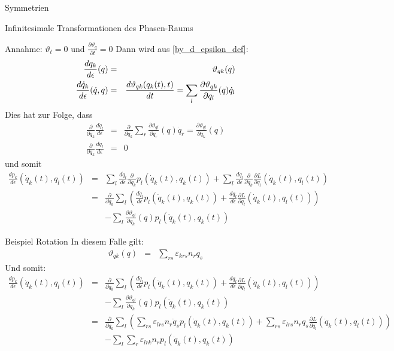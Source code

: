 \documentclass[a4paper,fleqn]{article}
\newcommand{\titlemath}[1]{\texorpdfstring{#1}{}}
\numberwithin{equation}{section}
\begin{document}
\begin{section}{Symmetrien}
\begin{subsection}{Infinitesimale Transformationen des Phasen-Raums}
\begin{subsubsection}{Annahme: \titlemath{$\vartheta_t=0$} und \titlemath{$\frac{\partial\vartheta_q}{\partial t}=0$}}
Dann wird aus \ref{by_d_epsilon_def}:
\begin{eqnarray*}
\frac{dq_k}{d\epsilon}(q) &=& \vartheta_{qk}(q)\cr
\frac{d\dot{q}_k}{d\epsilon}(\dot{q},q) &=&\frac{d\vartheta_{qk}(q_k(t),t)}{dt}
=\sum_l\frac{\partial\vartheta_{qk}}{\partial q_l}(q)\dot{q}_l
\end{eqnarray*}
Dies hat zur Folge, dass
\begin{eqnarray*}
\frac{\partial}{\partial \dot{q}_k}\frac{d\dot{q}_l}{d\epsilon} &=& \frac{\partial}{\partial \dot{q}_k}\sum_r\frac{\partial\vartheta_{ql}}{\partial q_r}(q)\dot{q}_r=\frac{\partial\vartheta_{ql}}{\partial q_k}(q)\\
\frac{\partial}{\partial \dot{q}_k}\frac{dq_l}{d\epsilon} &=& 0
\end{eqnarray*}
und somit
\begin{eqnarray*}
\frac{dp_k}{d\epsilon}\left(\dot{q}_k(t),q_l(t)\right) &=&\sum_l\frac{d\dot{q}_l}{d\epsilon}\frac{\partial}{\partial \dot{q}_k}p_l\left(\dot{q}_k(t),q_k(t)\right)
+\sum_l\frac{dq_l}{d\epsilon}\frac{\partial}{\partial \dot{q}_k}\frac{\partial L}{\partial q_l}\left(\dot{q}_k(t),q_l(t)\right)\\
&=&\frac{\partial}{\partial \dot{q}_k}\sum_l\left(\frac{d\dot{q}_l}{d\epsilon}p_l\left(\dot{q}_k(t),q_k(t)\right)
+\frac{dq_l}{d\epsilon}\frac{\partial L}{\partial q_l}\left(\dot{q}_k(t),q_l(t)\right)\right)\\
&&-\sum_l\frac{\partial\vartheta_{ql}}{\partial q_k}(q)p_l\left(\dot{q}_k(t),q_k(t)\right)
\end{eqnarray*}
\begin{paragraph}{Beispiel Rotation}
In diesem Falle gilt:
\begin{eqnarray*}
\vartheta_{qk}(q) &=& \sum_{rs}\varepsilon_{krs}n_rq_s
\end{eqnarray*}
Und somit:
\begin{eqnarray*}
\frac{dp_k}{d\epsilon}\left(\dot{q}_k(t),q_l(t)\right) &=&\frac{\partial}{\partial \dot{q}_k}\sum_l\left(\frac{d\dot{q}_l}{d\epsilon}p_l\left(\dot{q}_k(t),q_k(t)\right)
+\frac{dq_l}{d\epsilon}\frac{\partial L}{\partial q_l}\left(\dot{q}_k(t),q_l(t)\right)\right)\\
&&-\sum_l\frac{\partial\vartheta_{ql}}{\partial q_k}(q)p_l\left(\dot{q}_k(t),q_k(t)\right)\\
&=&\frac{\partial}{\partial \dot{q}_k}\sum_l\left(\sum_{rs}\varepsilon_{lrs}n_r\dot{q}_sp_l\left(\dot{q}_k(t),q_k(t)\right)
+\sum_{rs}\varepsilon_{lrs}n_rq_s\frac{\partial L}{\partial q_l}\left(\dot{q}_k(t),q_l(t)\right)\right)\\
&&-\sum_l\sum_r\varepsilon_{lrk}n_rp_l\left(\dot{q}_k(t),q_k(t)\right)
\end{eqnarray*}
\end{paragraph}
\end{subsubsection}
\end{subsection}


\end{section}
\end{document}
